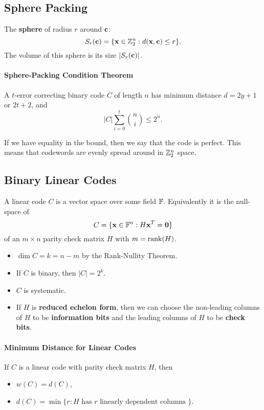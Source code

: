 
\subsection{Sphere Packing}
The \textbf{sphere} of radius \(r\) around \(\mathbf{c}\):
\[S_r(\mathbf{c}) = \{ \mathbf{x} \in \mathbb{Z}_2^n : d(\mathbf{x}, \mathbf{c}) \leq r \}.\]
The volume of this sphere is its size \(|S_r(\mathbf{c})|\).

\paragraph{Sphere-Packing Condition Theorem}
A \(t\)-error correcting binary code \(C\) of length \(n\) has minimum distance \(d = 2y + 1\) or \(2t + 2\), and
\[|C|\sum_{i=0}^t \binom{n}{i} \leq 2^n.\]

If we have equality in the bound, then we say that the code is perfect.  This means that codewords are evenly spread around in \(\mathbb{Z}_2^n\) space.

\subsection{Binary Linear Codes}
A linear code \(C\) is a vector space over some field \(\mathbb{F}\). Equivalently it is the null-space of
\[C = \{\mathbf{x} \in \mathbb{F}^n : H\mathbf{x}^T = \mathbf{0} \}\]
of an \(m \times n\) parity check matrix \(H\) with \(m = \rank(H)\).
\begin{itemize}
    \item \(\dim C = k = n - m\) by the Rank-Nullity Theorem.
    \item If \(C\) is binary, then \(|C| = 2^k\).
    \item \(C\) is systematic.
    \item If \(H\) is \textbf{reduced echelon form}, then we can choose the non-leading columns of \(H\) to be \textbf{information bits} and the leading columns of \(H\) to be \textbf{check bits}.
\end{itemize}

\paragraph{Minimum Distance for Linear Codes}
If \(C\) is a linear code with parity check matrix \(H\), then
\begin{itemize}
    \item\(w(C) = d(C)\),
    \item \(d(C) = \min\{ r: H \text{ has } r \text{ linearly dependent columns } \}\).
\end{itemize}

